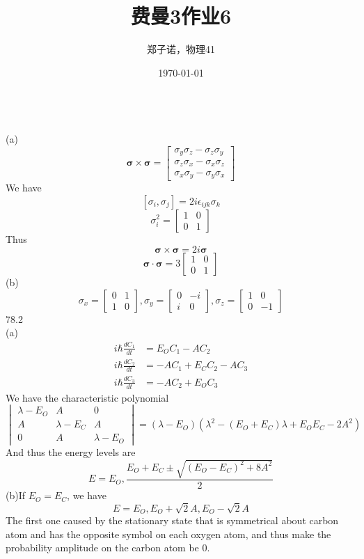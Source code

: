 \documentclass[utf8]{ctexart}
\title{费曼3作业6}
\author{郑子诺，物理41}
\date{\today}
\begin{document}
\maketitle
{}\\
(a)
\[\bm{\sigma}\times\bm{\sigma}=\begin{bmatrix}
	\sigma_y\sigma_z-\sigma_z\sigma_y\\
	\sigma_z\sigma_x-\sigma_x\sigma_z\\
	\sigma_x\sigma_y-\sigma_y\sigma_x
\end{bmatrix}\]
We have
\[[\sigma_i,\sigma_j]=2i\epsilon_{ijk}\sigma_k\]
\[\sigma^2_i=\begin{bmatrix}
	1&0\\
	0&1
\end{bmatrix}\]
Thus
\[\bm{\sigma}\times\bm{\sigma}=2i\bm{\sigma}\]
\[\bm{\sigma}\cdot\bm{\sigma}=
3\begin{bmatrix}
	1&0\\
	0&1
\end{bmatrix}\]
(b)
\[\sigma_x=\begin{bmatrix}
	0&1\\
	1&0
\end{bmatrix},\sigma_y=\begin{bmatrix}
0&-i\\
i&0
\end{bmatrix},\sigma_z=\begin{bmatrix}
1&0\\
0&-1
\end{bmatrix}\]
78.2\\
(a)\begin{align*}
	i\hbar\frac{dC_1}{dt}&=E_OC_1-AC_2\\
	i\hbar\frac{dC_2}{dt}&=-AC_1+E_CC_2-AC_3\\
	i\hbar\frac{dC_3}{dt}&=-AC_2+E_OC_3
\end{align*}
We have the characteristic polynomial
\[\begin{vmatrix}
	\lambda-E_O&A&0\\
	A&\lambda-E_C&A\\
	0&A&\lambda-E_O
\end{vmatrix}=(\lambda-E_O)(\lambda^2-(E_O+E_C)\lambda+E_OE_C-2A^2)\]
And thus the energy levels are
\[E=E_O,\frac{E_O+E_C\pm\sqrt{(E_O-E_C)^2+8A^2}}{2}\]
(b)If $E_O=E_C$, we have
\[E=E_O,E_O+\sqrt{2}A,E_O-\sqrt{2}A\]
\indent The first one caused by the stationary state that is symmetrical about carbon atom and has the opposite symbol on each oxygen atom, and thus make the probability amplitude on the carbon atom be $0$.\\
\end{document}
